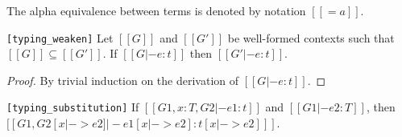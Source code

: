 \begin{definition}
    The alpha equivalence between terms is denoted by notation $[[=a]]$.
\end{definition}

\begin{lemma}[Weakening] \label{lem:appendix:thin}
    \verb|[typing_weaken]|
    Let $[[G]]$ and $[[G']]$ be well-formed contexts such that $[[G]] \subseteq
[[G']]$. If $[[G |- e : t]]$ then $[[G' |- e : t]]$.
\end{lemma}

\begin{proof}
    By trivial induction on the derivation of $[[G |- e : t]]$.
\end{proof}

\begin{lemma}[Substitution]\label{lem:appendix:subst}
\verb|[typing_substitution]|
	If $[[G1, x:T, G2 |- e1:t]]$ and $[[G1 |- e2:T]]$, then $[[G1, G2 [x |-> e2]
|- e1[x |-> e2]  : t[x |-> e2] ]]$.
\end{lemma}


